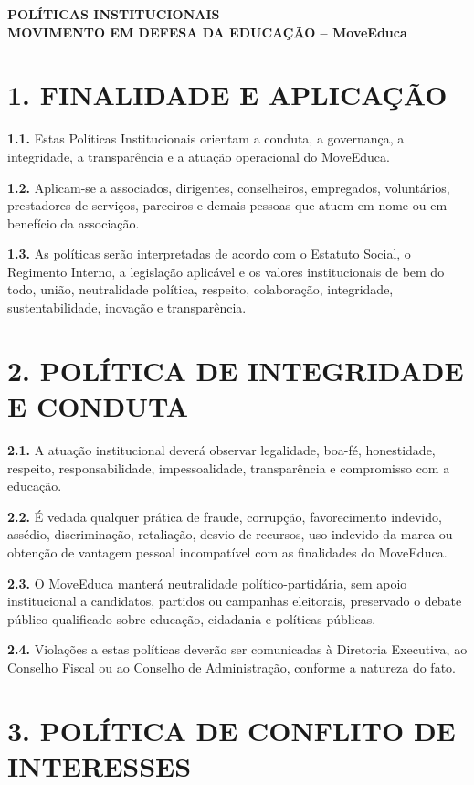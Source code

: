 \documentclass[11pt,a4paper]{article}
\begin{document}
\begin{center}
\textbf{\Large POLÍTICAS INSTITUCIONAIS}\\
\textbf{\large MOVIMENTO EM DEFESA DA EDUCAÇÃO -- MoveEduca}
\end{center}

\section*{1. FINALIDADE E APLICAÇÃO}

\textbf{1.1.} Estas Políticas Institucionais orientam a conduta, a governança, a integridade, a transparência e a atuação operacional do MoveEduca.

\textbf{1.2.} Aplicam-se a associados, dirigentes, conselheiros, empregados, voluntários, prestadores de serviços, parceiros e demais pessoas que atuem em nome ou em benefício da associação.

\textbf{1.3.} As políticas serão interpretadas de acordo com o Estatuto Social, o Regimento Interno, a legislação aplicável e os valores institucionais de bem do todo, união, neutralidade política, respeito, colaboração, integridade, sustentabilidade, inovação e transparência.

\section*{2. POLÍTICA DE INTEGRIDADE E CONDUTA}

\textbf{2.1.} A atuação institucional deverá observar legalidade, boa-fé, honestidade, respeito, responsabilidade, impessoalidade, transparência e compromisso com a educação.

\textbf{2.2.} É vedada qualquer prática de fraude, corrupção, favorecimento indevido, assédio, discriminação, retaliação, desvio de recursos, uso indevido da marca ou obtenção de vantagem pessoal incompatível com as finalidades do MoveEduca.

\textbf{2.3.} O MoveEduca manterá neutralidade político-partidária, sem apoio institucional a candidatos, partidos ou campanhas eleitorais, preservado o debate público qualificado sobre educação, cidadania e políticas públicas.

\textbf{2.4.} Violações a estas políticas deverão ser comunicadas à Diretoria Executiva, ao Conselho Fiscal ou ao Conselho de Administração, conforme a natureza do fato.

\section*{3. POLÍTICA DE CONFLITO DE INTERESSES}
\end{document}
